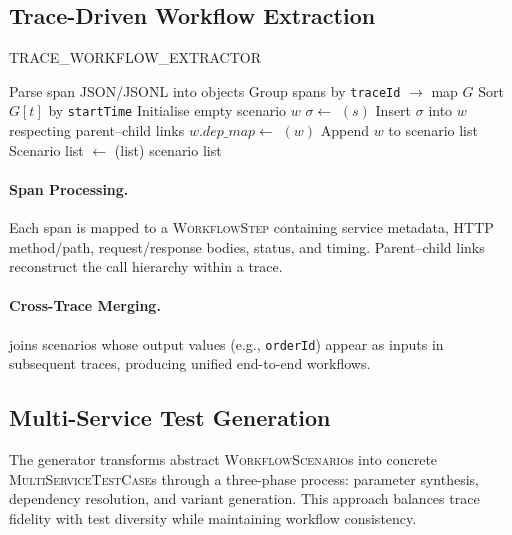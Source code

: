 \documentclass[conference]{IEEEtran}
\begin{document}
\subsection{Trace-Driven Workflow Extraction}
\label{ssec:extract}
\begin{algorithm}[tb]
\caption{TRACE\_WORKFLOW\_EXTRACTOR}\label{alg:extract}
\footnotesize
\begin{algorithmic}[1]
\Require{}
\Ensure{}
\State Parse span JSON/JSONL into objects
\State Group spans by \texttt{traceId} $\rightarrow$ map $G$
    \State Sort $G[t]$ by \texttt{startTime}
    \State Initialise empty scenario $w$
        \State $\sigma \leftarrow$ $(s)$
        \State Insert $\sigma$ into $w$ respecting parent–child links
    \EndFor
    \State $w.dep\_map \leftarrow$ $(w)$
    \State Append $w$ to scenario list
\EndFor
\State Scenario list $\gets$ (list)
\State \Return scenario list
\end{algorithmic}
\end{algorithm}

\paragraph{Span Processing.}
Each span is mapped to a \textsc{WorkflowStep} containing service metadata,
HTTP method/path, request/response bodies, status, and timing.  Parent–child
links reconstruct the call hierarchy within a trace.

\paragraph{Cross-Trace Merging.}
 joins scenarios whose output values (e.g.,
\texttt{orderId}) appear as inputs in subsequent traces, producing unified
end-to-end workflows.

\subsection{Multi-Service Test Generation}
\label{ssec:gen}

The generator transforms abstract \textsc{WorkflowScenario}s into concrete
\textsc{MultiServiceTestCase}s through a three-phase process: parameter
synthesis, dependency resolution, and variant generation.  This approach
balances trace fidelity with test diversity while maintaining workflow
consistency.
\end{document}
